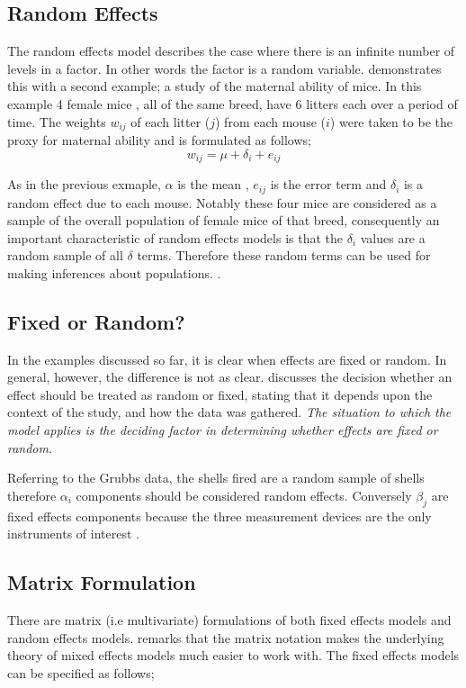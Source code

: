 \documentclass[12pt, a4paper]{report}
\theoremstyle{plain}
\theoremstyle{definition}
\theoremstyle{remark}
\begin{document}
\subsection{Random Effects}
The random effects model describes the case where there is an
infinite number of levels in a factor. In other words the factor
is a random variable. \citet{Searle} demonstrates this with a
second example; a study of the maternal ability of mice. In this
example 4 female mice , all of the same breed, have 6 litters each
over a period of time. The weights $w_{ij}$ of each litter ($j$)
from each mouse ($i$) were taken to be the proxy for maternal
ability and is formulated as follows;
\begin{equation}
w_{ij} = \mu + \delta_{i} + e_{ij}
\end{equation}

As in the previous exmaple, $\alpha$ is the mean , $e_{ij}$ is the
error term and $\delta_{i}$ is a random effect due to each mouse.
Notably these four mice are considered as a sample of the overall
population of female mice of that breed, consequently an important
characteristic of random effects models is that the $\delta_{i}$
values are a random sample of all $\delta$ terms. Therefore these
random terms can be used for making inferences about populations.
\citep{McCullSearle}.


\subsection{Fixed or Random?}

In the examples discussed so far, it is clear when effects are
fixed or random. In general, however, the difference is not as
clear. \citet{Searle} discusses the decision whether an effect
should be treated as random or fixed, stating that it depends upon
the context of the study, and how the data was gathered. \emph{The
	situation to which the model applies is the deciding factor in
	determining whether effects are fixed or random}.

Referring to the Grubbs data, the shells fired are a random sample
of shells therefore $\alpha_{i}$ components should be considered
random effects. Conversely $\beta_{j}$ are fixed effects
components because the three measurement devices are the only
instruments of interest \citep{Searle}.



\subsection{Matrix Formulation} There are matrix (i.e multivariate)
formulations of both fixed effects models and random effects
models. \citet{BrownPrescott} remarks that the matrix notation
makes the underlying theory of mixed effects models much easier to
work with. The fixed effects models can be specified as follows;
\end{document}
